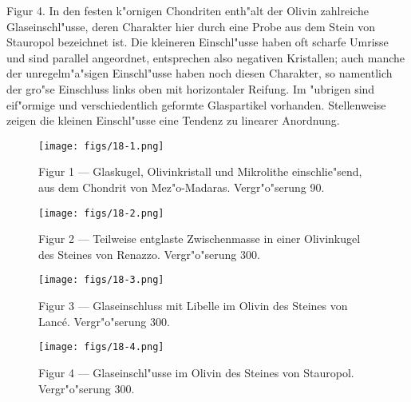 \documentclass[a4paper, 11pt, oneside, polutonikogreek, german]{article}
\begin{document}
Figur 4. In den festen k"ornigen Chondriten enth"alt der Olivin zahlreiche Glaseinschl"usse, deren Charakter hier durch eine Probe aus dem Stein von Stauropol bezeichnet ist. Die kleineren Einschl"usse haben oft scharfe Umrisse und sind parallel angeordnet, entsprechen also negativen Kristallen; auch manche der unregelm"a"sigen Einschl"usse haben noch diesen Charakter, so namentlich der gro"se Einschluss links oben mit horizontaler Reifung. Im "ubrigen sind eif"ormige und verschiedentlich geformte Glaspartikel vorhanden. Stellenweise zeigen die kleinen Einschl"usse eine Tendenz zu linearer Anordnung.
\clearpage

\vspace*{\fill}
\begin{figure}[H]
\centering
\texttt{[image: figs/18-1.png]}
\caption{\small Figur 1 --- Glaskugel, Olivinkristall und Mikrolithe einschlie"send, aus dem Chondrit von Mez"o-Madaras. Vergr"o"serung 90.}
\end{figure}
\vspace*{\fill}
\clearpage

\vspace*{\fill}
\begin{figure}[H]
\centering
\texttt{[image: figs/18-2.png]}
\caption{\small Figur 2 --- Teilweise entglaste Zwischenmasse in einer Olivinkugel des Steines von Renazzo. Vergr"o"serung 300.}
\end{figure}
\vspace*{\fill}
\clearpage

\vspace*{\fill}
\begin{figure}[H]
\centering
\texttt{[image: figs/18-3.png]}
\caption{\small Figur 3 --- Glaseinschluss mit Libelle im Olivin des Steines von Lancé. Vergr"o"serung 300.}
\end{figure}
\vspace*{\fill}
\clearpage

\vspace*{\fill}
\begin{figure}[H]
\centering
\texttt{[image: figs/18-4.png]}
\caption{\small Figur 4 --- Glaseinschl"usse im Olivin des Steines von Stauropol. Vergr"o"serung 300.}
\end{figure}
\vspace*{\fill}
\clearpage
\end{document}

